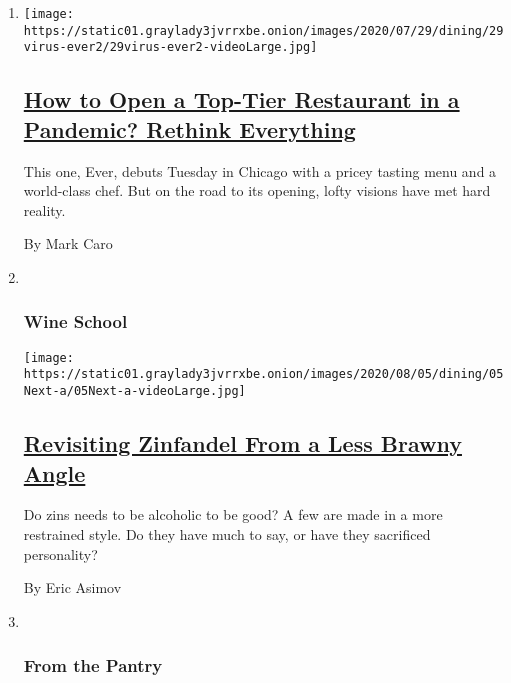\begin{enumerate}
\def\labelenumi{\arabic{enumi}.}
\item
  \texttt{[image: https://static01.graylady3jvrrxbe.onion/images/2020/07/29/dining/29virus-ever2/29virus-ever2-videoLarge.jpg]}

  \hypertarget{how-to-open-a-top-tier-restaurant-in-a-pandemic-rethink-everything}{%
  \subsection{\texorpdfstring{\href{/2020/07/28/dining/ever-chicago-restaurant-coronavirus.html}{How
  to Open a Top-Tier Restaurant in a Pandemic? Rethink
  Everything}}{How to Open a Top-Tier Restaurant in a Pandemic? Rethink Everything}}\label{how-to-open-a-top-tier-restaurant-in-a-pandemic-rethink-everything}}

  This one, Ever, debuts Tuesday in Chicago with a pricey tasting menu
  and a world-class chef. But on the road to its opening, lofty visions
  have met hard reality.

  By Mark Caro
\item ~
  \hypertarget{wine-school-1}{%
  \subsubsection{Wine School}\label{wine-school-1}}

  \texttt{[image: https://static01.graylady3jvrrxbe.onion/images/2020/08/05/dining/05Next-a/05Next-a-videoLarge.jpg]}

  \hypertarget{revisiting-zinfandel-from-a-less-brawny-angle}{%
  \subsection{\texorpdfstring{\href{/2020/07/30/dining/drinks/wine-school-assignment-zinfandel.html}{Revisiting
  Zinfandel From a Less Brawny
  Angle}}{Revisiting Zinfandel From a Less Brawny Angle}}\label{revisiting-zinfandel-from-a-less-brawny-angle}}

  Do zins needs to be alcoholic to be good? A few are made in a more
  restrained style. Do they have much to say, or have they sacrificed
  personality?

  By Eric Asimov
\item ~
  \hypertarget{from-the-pantry}{%
  \subsubsection{From the Pantry}\label{from-the-pantry}}


\end{enumerate}

